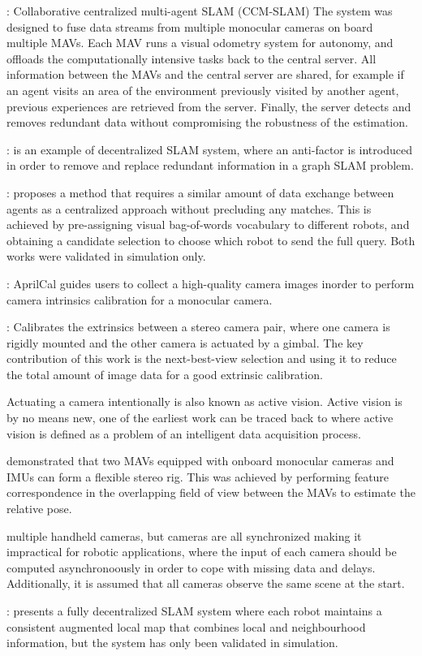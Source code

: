 \documentclass{article}
\begin{document}
: Collaborative centralized multi-agent SLAM
(CCM-SLAM) The system was designed to fuse data streams from multiple monocular
cameras on board multiple MAVs. Each MAV runs a visual odometry system for
autonomy, and offloads the computationally intensive tasks back to the central
server. All information between the MAVs and the central server are shared, for
example if an agent visits an area of the environment previously visited by
another agent, previous experiences are retrieved from the server. Finally, the
server detects and removes redundant data without compromising the robustness
of the estimation.

: is an example of decentralized SLAM system, where an
anti-factor is introduced in order to remove and replace redundant information
in a graph SLAM problem.

: proposes a method that requires a similar
amount of data exchange between agents as a centralized approach without
precluding any matches. This is achieved by pre-assigning visual bag-of-words
vocabulary to different robots, and obtaining a candidate selection to choose
which robot to send the full query.  Both works were validated in simulation
only.

: AprilCal guides users to collect a high-quality
camera images inorder to perform camera intrinsics calibration for a monocular
camera.

: Calibrates the extrinsics between a
stereo camera pair, where one camera is rigidly mounted and the other camera is
actuated by a gimbal. The key contribution of this work is the next-best-view
selection and using it to reduce the total amount of image data for a good
extrinsic calibration.

 Actuating a camera intentionally is also known as
active vision. Active vision is by no means new, one of the earliest work can
be traced back to \cite{Bajcsy1988} where active vision is defined as a
problem of an intelligent data acquisition process.

 demonstrated that two MAVs equipped with
onboard monocular cameras and IMUs can form a flexible stereo rig. This was
achieved by performing feature correspondence in the overlapping field of view
between the MAVs to estimate the relative pose.

 multiple handheld cameras, but cameras are all
synchronized making it impractical for robotic applications, where the input of
each camera should be computed asynchronoously in order to cope with missing
data and delays. Additionally, it is assumed that all cameras observe the same
scene at the start.

:
presents a fully decentralized SLAM system where
each robot maintains a consistent augmented local map that combines local and
neighbourhood information, but the system has only been validated in
simulation.




\end{document}
